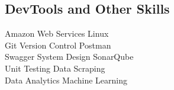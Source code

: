 \documentclass[]{deedy-resume-openfont}
\begin{document}
\begin{minipage}[t]{0.33\textwidth}
\sectionsep

\subsection{DevTools and Other Skills}
\textbullet{} Amazon Web Services 
\textbullet{} Linux \\
\textbullet{} Git Version Control 
\textbullet{} Postman \\
\textbullet{} Swagger 
\textbullet{} System Design
\textbullet{} SonarQube \\
\textbullet{} Unit Testing
\textbullet{} Data Scraping  \\
\textbullet{} Data Analytics
\textbullet{} Machine Learning \\

%
%

\end{minipage} 
\end{document}

